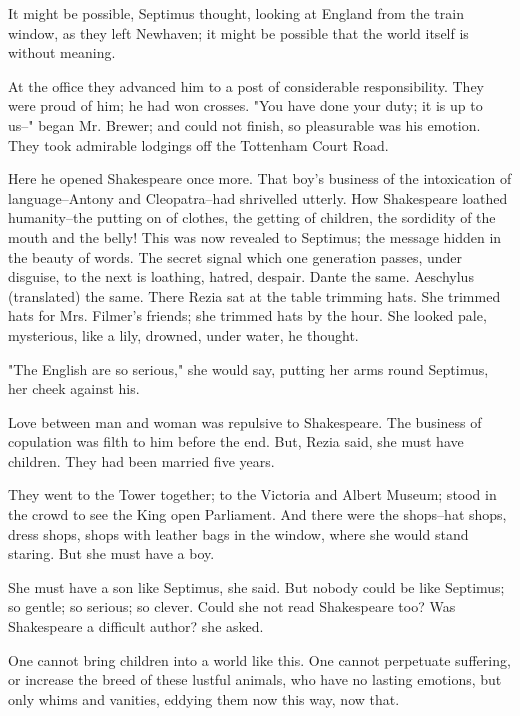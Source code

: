 \documentclass[lang=cn,10pt]{elegantbook}
\begin{document}
It might be possible, Septimus thought, looking at England from the
train window, as they left Newhaven; it might be possible that the
world itself is without meaning.

At the office they advanced him to a post of considerable
responsibility.  They were proud of him; he had won crosses.  "You
have done your duty; it is up to us--" began Mr. Brewer; and could
not finish, so pleasurable was his emotion.  They took admirable
lodgings off the Tottenham Court Road.

Here he opened Shakespeare once more.  That boy's business of the
intoxication of language--Antony and Cleopatra--had shrivelled
utterly.  How Shakespeare loathed humanity--the putting on of
clothes, the getting of children, the sordidity of the mouth and
the belly!  This was now revealed to Septimus; the message hidden
in the beauty of words.  The secret signal which one generation
passes, under disguise, to the next is loathing, hatred, despair.
Dante the same.  Aeschylus (translated) the same.  There Rezia sat
at the table trimming hats.  She trimmed hats for Mrs. Filmer's
friends; she trimmed hats by the hour.  She looked pale,
mysterious, like a lily, drowned, under water, he thought.

"The English are so serious," she would say, putting her arms round
Septimus, her cheek against his.

Love between man and woman was repulsive to Shakespeare.  The
business of copulation was filth to him before the end.  But, Rezia
said, she must have children.  They had been married five years.

They went to the Tower together; to the Victoria and Albert Museum;
stood in the crowd to see the King open Parliament.  And there were
the shops--hat shops, dress shops, shops with leather bags in the
window, where she would stand staring.  But she must have a boy.

She must have a son like Septimus, she said.  But nobody could be
like Septimus; so gentle; so serious; so clever.  Could she not
read Shakespeare too?  Was Shakespeare a difficult author? she
asked.

One cannot bring children into a world like this.  One cannot
perpetuate suffering, or increase the breed of these lustful
animals, who have no lasting emotions, but only whims and vanities,
eddying them now this way, now that.
\end{document}
